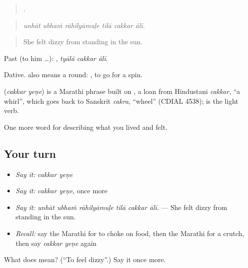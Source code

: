 \begin{quote}
     .
\end{quote}

\begin{quote}
\emph{unhāt ubhaṁ rāhilyāmuḷe tilā cakkar ālī.}
\end{quote}

\begin{quote}
She felt dizzy from standing in the sun.
\end{quote}

Past (to him …):   , \emph{tyālā cakkar ālī}.

Dative.  also means a round:  , to go for a spin.

\begin{cousinweb}
\textbf{ } (\emph{cakkar yeṇe}) is a Marathi phrase built on , a loan from Hindustani \emph{cakkar}, \textquotedblleft{}a whirl\textquotedblright{}, which goes back to Sanskrit \emph{cakra}, \textquotedblleft{}wheel\textquotedblright{} (CDIAL 4538);  is the light verb.
\end{cousinweb}

\begin{grammarlens}[title={What you've built}]
One more word for describing what you lived and felt.
\end{grammarlens}

\subsection*{Your turn}
\begin{itemize}
\raggedright
  \item \emph{Say it:} \emph{cakkar yeṇe}
  \item \emph{Say it:} \emph{cakkar yeṇe}, once more
  \item \emph{Say it:} \emph{unhāt ubhaṁ rāhilyāmuḷe tilā cakkar ālī.} — She felt dizzy from standing in the sun.
  \item \emph{Recall:} say the Marathi for to choke on food, then the Marathi for a crutch, then say \emph{cakkar yeṇe} again
\end{itemize}

\begin{tcolorbox}[breakable,colback=teal!4,colframe=teal!35!black,title={Before you move on}]
What does   mean? (\textquotedblleft{}To feel dizzy\textquotedblright{}.) Say it once more.
\end{tcolorbox}
